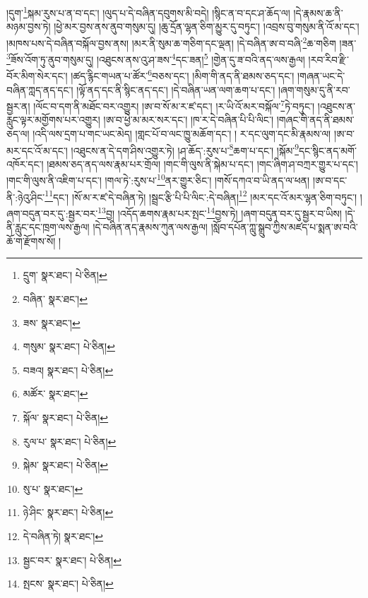 །དུག་\footnote{དྲུག་  སྣར་ཐང་།  པེ་ཅིན། }སྐམ་རུས་པ་ན་བ་དང་། །ལུད་པ་དེ་བཞིན་དབུགས་མི་བདེ། །སྙིང་ན་བ་དང་ཤ་ཆོད་ལ། །དེ་རྣམས་ཆ་ནི་མཉམ་བྱས་ཏེ། །ཕྱེ་མར་བྱས་ནས་ནུབ་གསུམ་དུ། །ཆུ་དྲོན་ལྷན་ཅིག་མྱུར་དུ་བཏུང་། །འབྲས་བུ་གསུམ་ནི་འོ་མ་དང་། །མཁས་པས་དེ་བཞིན་བསྐོལ་བྱས་ནས། །མར་ནི་སུམ་ཆ་གཅིག་དང་ལྡན། །དེ་བཞིན་ཨ་བ་བཞི་\footnote{བཞིན་  སྣར་ཐང་། }ཆ་གཅིག །ཟན་\footnote{ཟས་  སྣར་ཐང་། }ཟོས་འོག་ཏུ་ནུབ་གསུམ་དུ། །འཐུངས་ནས་འུ་ཤ་ཟས་\footnote{གསུམ་  སྣར་ཐང་།  པེ་ཅིན། }དང་ཟན།\footnote{བཟའ།  སྣར་ཐང་།  པེ་ཅིན། } །གྱེན་དུ་ཟ་བའི་ནད་ལས་རྒྱལ། །རབ་རིབ་རྫི་བོར་མིག་སེར་དང་། །ཚད་རྙིང་གཡན་པ་ཚོར་\footnote{མཚོར་  སྣར་ཐང་། }བཅས་དང་། །མིག་གི་ནད་ནི་ཐམས་ཅད་དང་། །གཞན་ཡང་དེ་བཞིན་ཀླད་ནད་དང་། །ལྟོ་ནད་དང་ནི་སྙིང་ནད་དང་། །དེ་བཞིན་ཡན་ལག་ཆག་པ་དང་། །ཞག་གསུམ་དུ་ནི་རབ་སྦྱར་ན། །ལོང་བ་དག་ནི་མཐོང་བར་འགྱུར། །ཨ་བ་སོ་མ་ར་ཛ་དང་། །ར་ཡི་འོ་མར་བསྐོལ་\footnote{སྐོལ་  སྣར་ཐང་།  པེ་ཅིན། }ཏེ་བཏུང་། །འཐུངས་ན་རླུང་ལྟར་མགྱོགས་པར་འགྱུར། །ཨ་བ་ཕྱེ་མ་མར་སར་དང་། །ཁ་ར་དེ་བཞིན་པི་པི་ལིང་། །གཞང་གི་ནད་ནི་ཐམས་ཅད་ལ། །འདི་ལས་དྲག་པ་གང་ཡང་མེད། །གླང་པོ་བ་ལང་ཁྱུ་མཆོག་དང་། །
ར་དང་ལུག་དང་མི་རྣམས་ལ། །ཨ་བ་མར་དང་འོ་མ་དང་། །འཐུངས་ན་དེ་དག་ཤིས་འགྱུར་ཏེ། །ཤ་ཆོད་:རུས་པ་\footnote{རུལ་པ་  སྣར་ཐང་།  པེ་ཅིན། }ཆག་པ་དང་། །སྐོམ་\footnote{སྐེམ་  སྣར་ཐང་།  པེ་ཅིན། }དང་སྙིང་ནད་མགོ་འཁོར་དང་། །ཐམས་ཅད་ནད་ལས་རྣམ་པར་གྲོལ། །གང་གི་ལུས་ནི་སྐེམ་པ་དང་། །གང་ཞིག་ཤ་བཀྲར་གྱུར་པ་དང་། །གང་གི་ལུས་ནི་འཇིག་པ་དང་། །གལ་ཏེ་:རུས་པ་\footnote{སུ་པ་  སྣར་ཐང་། }ནར་གྱུར་ཅིང་། །གསོ་དཀའ་བ་ཡི་ནད་ལ་ཕན། །ཨ་བ་དང་ནི་:ཉེའུ་ཤིང་\footnote{ཉེ་ཤིང་  སྣར་ཐང་།  པེ་ཅིན། }དང་། །སོ་མ་ར་ཛ་དེ་བཞིན་ཏེ། །སྦྲང་རྩི་པི་པི་ལིང་:དེ་བཞིན།\footnote{དེ་བཞིན་ཏེ།  སྣར་ཐང་། } །མར་དང་འོ་མར་ལྷན་ཅིག་བཏུང་། །ཞག་བདུན་བར་དུ་:སྦྱར་བར་\footnote{སྦྱང་བར་  སྣར་ཐང་།  པེ་ཅིན། }བྱ། །འདོད་ཆགས་རྣམ་པར་སྤང་\footnote{སྤངས་  སྣར་ཐང་།  པེ་ཅིན། }བྱས་ཏེ། །ཞག་བདུན་བར་དུ་སྦྱར་བ་ཡིས། །དེ་ནི་རླུང་དང་ཁྲག་ལས་རྒྱལ། །དེ་བཞིན་ནད་རྣམས་ཀུན་ལས་རྒྱལ། །སློབ་དཔོན་ཀླུ་སྒྲུབ་ཀྱིས་མཛད་པ་སྨན་ཨ་བའི་ཆོ་ག་རྫོགས་སོ། །